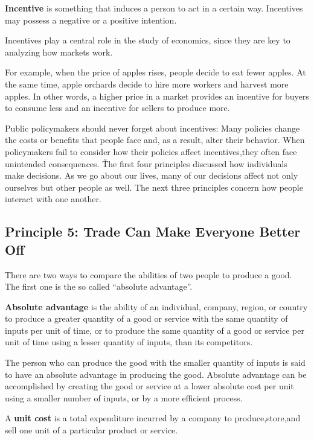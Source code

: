 \bd[Incentive]
\textbf{Incentive} is something that induces a person to act in a certain way. Incentives may possess a negative or a
positive intention.
\ed

Incentives play a central role in the study of economics, since they are key to analyzing how markets work.

\be
For example, when the price of apples rises, people decide to eat fewer apples. At the same time, apple orchards
decide to hire more workers and harvest more apples. In other words, a higher price in a market provides an incentive
for buyers to consume less and an incentive for sellers to produce more.
\ee

Public policymakers should never forget about incentives: Many policies change the costs or benefits that people face
and, as a result, alter their behavior. When policymakers fail to consider how their policies affect incentives,they
often face unintended consequences. \v

The first four principles discussed how individuals make decisions. As we go about our lives, many of our decisions
affect not only ourselves but other people as well. The next three principles concern how people interact with one
another.

\subsection*{Principle 5: Trade Can Make Everyone Better Off}

There are two ways to compare the abilities of two people to produce a good. The first one is the so called
``absolute advantage''.

\textbf{Absolute advantage} is the ability of an individual, company, region, or country to produce a greater
quantity of a good or service with the same quantity of inputs per unit of time, or to produce the same quantity of a
good or service per unit of time using a lesser quantity of inputs, than its competitors.
\ed

The person who can produce the good with the smaller quantity of inputs is said to have an absolute advantage in
producing the good. Absolute advantage can be accomplished by creating the good or service at a lower absolute cost
per unit using a smaller number of inputs, or by a more efficient process.

A \textbf{unit cost} is a total expenditure incurred by a company to produce,store,and sell one unit of a particular
product or service.
\ed


